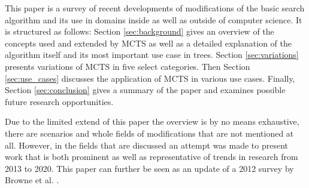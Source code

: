 This paper is a survey of recent developments of modifications of the basic search algorithm and its use in domains inside as well as outside of computer science. It is structured as follows: Section \ref{sec:background} gives an overview of the concepts used and extended by MCTS as well as a detailed explanation of the algorithm itself and its most important use case in trees. Section \ref{sec:variations} presents variations of MCTS in five select categories. Then Section \ref{sec:use_cases} discusses the application of MCTS in various use cases. Finally, Section \ref{sec:conclusion} gives a summary of the paper and examines possible future research opportunities.

Due to the limited extend of this paper the overview is by no means exhaustive, there are scenarios and whole fields of modifications that are not mentioned at all. However, in the fields that are discussed an attempt was made to present work that is both prominent as well as representative of trends in research from 2013 to 2020. This paper can further be seen as an update of a 2012 survey by Browne et al. \cite{browne2012survey}.